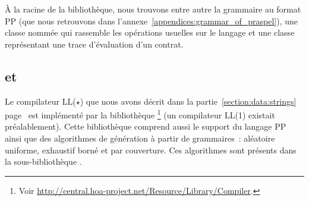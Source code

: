 À la racine de la bibliothèque, nous trouvons entre autre la grammaire au format
PP (que nous retrouvons dans l'annexe~\ref{appendices:grammar_of_praspel}), une
classe nommée  qui rassemble les opérations usuelles
sur le langage et une classe représentant une trace d'évaluation d'un contrat.

\subsection{ et }
\label{subsection:tools:hoa-compiler-regex}

Le compilateur LL($\star$) que nous avons décrit dans la
partie~\ref{section:data:strings} page~\pageref{section:data:strings} est
implémenté par la bibliothèque
\footnote{Voir
\url{http://central.hoa-project.net/Resource/Library/Compiler}.} (un compilateur
LL(1) existait préalablement). Cette bibliothèque comprend aussi le support du
langage PP ainsi que des algorithmes de génération à partir de grammaires~:
aléatoire uniforme, exhaustif borné et par couverture. Ces algorithmes sont
présents dans la sous-bibliothèque
.

